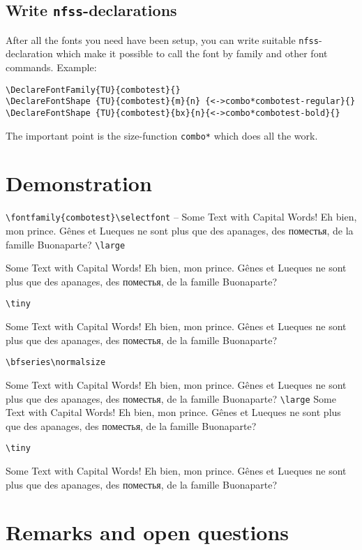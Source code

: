 \documentclass[parskip=half-]{scrartcl}
\begin{document}
\subsection{Write \texttt{nfss}-declarations}

After all the fonts you need have been setup, you can write suitable \texttt{nfss}-declaration which make it possible to call the font by family and other font commands. Example:

\begin{verbatim}
\DeclareFontFamily{TU}{combotest}{}
\DeclareFontShape {TU}{combotest}{m}{n} {<->combo*combotest-regular}{}
\DeclareFontShape {TU}{combotest}{bx}{n}{<->combo*combotest-bold}{}
\end{verbatim}

The important point is the size-function \verb+combo*+ which does all the work. 


\section{Demonstration}


\verb+\fontfamily{combotest}\selectfont+
\selectfont --
Some Text with Capital Words!
Eh bien, mon prince. Gênes et Lueques ne sont plus que des
apanages, des поместья, de la famille Buonaparte?
%
\verb+\large+\large

Some Text with Capital Words!
Eh bien, mon prince. Gênes et Lueques ne sont plus que des
apanages, des поместья, de la famille Buonaparte?

\verb+\tiny+\tiny

Some Text with Capital Words!
Eh bien, mon prince. Gênes et Lueques ne sont plus que des
apanages, des поместья, de la famille Buonaparte?

\verb+\bfseries\normalsize+\bfseries
\normalsize

Some Text with Capital Words!
Eh bien, mon prince. Gênes et Lueques ne sont plus que des
apanages, des поместья, de la famille Buonaparte?
%
\verb+\large+\large
Some Text with Capital Words!
Eh bien, mon prince. Gênes et Lueques ne sont plus que des
apanages, des поместья, de la famille Buonaparte?

\verb+\tiny+\tiny

Some Text with Capital Words!
Eh bien, mon prince. Gênes et Lueques ne sont plus que des
apanages, des поместья, de la famille Buonaparte?
%

\normalfont
\section{Remarks and open questions}
\end{document}
